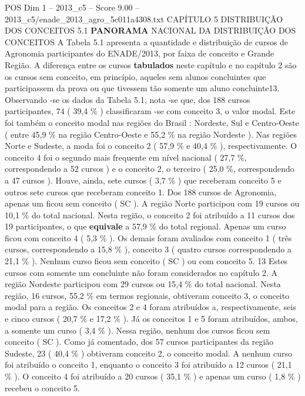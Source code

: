 \begin{textsample}{POS Dim 1 – 2013\_c5 – Score 9.00 – 2013\_c5/enade\_2013\_agro\_5c011a4308.txt}  \label{ex:f1_pos_089}
CAPÍTULO 5 DISTRIBUIÇÃO DOS CONCEITOS 5.1 \textbf{PANORAMA} NACIONAL DA DISTRIBUIÇÃO DOS CONCEITOS A Tabela 5.1 apresenta a quantidade e distribuição de cursos de Agronomia participantes do ENADE/2013, por faixa de conceito e Grande Região.
A diferença entre os cursos \textbf{tabulados} neste capítulo e no capítulo 2 são os cursos sem conceito, em princípio, aqueles sem alunos concluintes que participassem da prova ou que tivessem tão somente um aluno concluinte13.
Observando -se os dados da Tabela 5.1, nota -se que, dos 188 cursos participantes, 74 ( 39,4 \% ) classificaram -se com conceito 3, o valor modal.
Este foi também o conceito modal nas regiões do Brasil : Nordeste, Sul e Centro-Oeste ( entre 45,9 \% na região Centro-Oeste e 55,2 \% na região Nordeste ).
Nas regiões Norte e Sudeste, a moda foi o conceito 2 ( 57,9 \% e 40,4 \% ), respectivamente.
O conceito 4 foi o segundo mais frequente em nível nacional ( 27,7 \%, correspondendo a 52 cursos ) e o conceito 2, o terceiro ( 25,0 \%, correspondendo a 47 cursos ).
Houve, ainda, sete cursos ( 3,7 \% ) que receberam conceito 5 e outros sete cursos que receberam conceito 1.
Dos 188 cursos de Agronomia, apenas um ficou sem conceito ( SC ).
A região Norte participou com 19 cursos ou 10,1 \% do total nacional.
Nesta região, o conceito 2 foi atribuído a 11 cursos dos 19 participantes, o que \textbf{equivale} a 57,9 \% do total regional.
Apenas um curso ficou com conceito 4 ( 5,3 \% ).
Os demais foram avaliados com conceito 1 ( três cursos, correspondendo a 15,8 \% ), conceito 3 ( quatro cursos correspondendo a 21,1 \% ).
Nenhum curso ficou sem conceito ( SC ) ou com conceito 5. 13 Estes cursos com somente um concluinte não foram considerados no capítulo 2.
A região Nordeste participou com 29 cursos ou 15,4 \% do total nacional.
Nesta região, 16 cursos, 55,2 \% em termos regionais, obtiveram conceito 3, o conceito modal para a região.
Os conceitos 2 e 4 foram atribuídos a, respectivamente, seis e cinco cursos ( 20,7 \% e 17,2 \% ).
Já os conceitos 1 e 5 foram atribuídos, ambos, a somente um curso ( 3,4 \% ).
Nessa região, nenhum dos cursos ficou sem conceito ( SC ).
Como já comentado, dos 57 cursos participantes da região Sudeste, 23 ( 40,4 \% ) obtiveram conceito 2, o conceito modal.
A nenhum curso foi atribuído o conceito 1, enquanto o conceito 3 foi atribuído a 12 cursos ( 21,1 \% ).
O conceito 4 foi atribuído a 20 cursos ( 35,1 \% ) e apenas um curso ( 1,8 \% ) recebeu o conceito 5.

\end{textsample}
